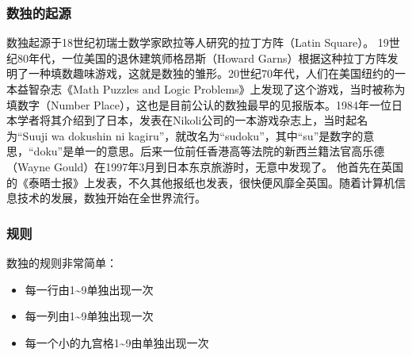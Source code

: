\documentclass[xcolor=table]{beamer}
\begin{document}
\begin{mdframe}%

\frametitle{数独的起源}\label{heading-section}%

\noindent{}数独起源于18世纪初瑞士数学家欧拉等人研究的拉丁方阵（Latin Square）。
19世纪80年代，一位美国的退休建筑师格昂斯（Howard Garns）根据这种拉丁方阵发明了一种填数趣味游戏，这就是数独的雏形。20世纪70年代，人们在美国纽约的一本益智杂志《Math Puzzles and Logic Problems》上发现了这个游戏，当时被称为填数字（Number Place），这也是目前公认的数独最早的见报版本。1984年一位日本学者将其介绍到了日本，发表在Nikoli公司的一本游戏杂志上，当时起名为“Suuji wa dokushin ni kagiru”，就改名为“sudoku”，其中“su”是数字的意思，“doku”是单一的意思。后来一位前任香港高等法院的新西兰籍法官高乐德（Wayne Gould）在1997年3月到日本东京旅游时，无意中发现了。
他首先在英国的《泰晤士报》上发表，不久其他报纸也发表，很快便风靡全英国。随着计算机信息技术的发展，数独开始在全世界流行。%
\end{mdframe}\label{section}%

\begin{mdframe}%

\frametitle{规则}\label{heading-section}%

\noindent{}数独的规则非常简单：%

\begin{itemize}[noitemsep,topsep=\mdcompacttopsep]%

\item{}每一行由1\textasciitilde{}9单独出现一次%

\item{}每一列由1\textasciitilde{}9单独出现一次%

\item{}每一个小的九宫格1\textasciitilde{}9由单独出现一次%
\end{itemize}%
\end{mdframe}\label{section}%
\end{document}
